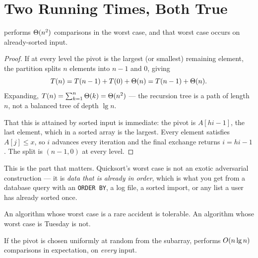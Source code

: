 \section{Two Running Times, Both True}

\begin{theorem}\label{thm:qsworst}
 performs $\Theta(n^{2})$ comparisons in the worst case, and
that worst case occurs on already-sorted input.
\end{theorem}

\begin{proof}
If at every level the pivot is the largest (or smallest) remaining element, the
partition splits $n$ elements into $n-1$ and $0$, giving
\[ T(n) = T(n-1) + T(0) + \Theta(n) = T(n-1) + \Theta(n). \]
Expanding, $T(n) = \sum_{k=1}^{n} \Theta(k) = \Theta(n^{2})$ --- the recursion
tree is a path of length $n$, not a balanced tree of depth $\lg n$.

\smallskip
That this is attained by sorted input is immediate: the pivot is $A[\mathit{hi}
-1]$, the last element, which in a sorted array is the largest. Every element
satisfies $A[j] \le x$, so $i$ advances every iteration and the final exchange
returns $i = \mathit{hi}-1$. The split is $(n-1, 0)$ at every level.
\end{proof}

\begin{alertbox}
This is the part that matters. Quicksort's worst case is not an exotic
adversarial construction --- it is \emph{data that is already in order}, which
is what you get from a database query with an \texttt{ORDER BY}, a log file, a
sorted import, or any list a user has already sorted once.

\smallskip
An algorithm whose worst case is a rare accident is tolerable. An algorithm
whose worst case is Tuesday is not.
\end{alertbox}

\begin{theorem}\label{thm:qsexpected}
If the pivot is chosen uniformly at random from the subarray, 
performs $O(n \operatorname{lg} n)$ comparisons in expectation, on \emph{every} input.
\end{theorem}

